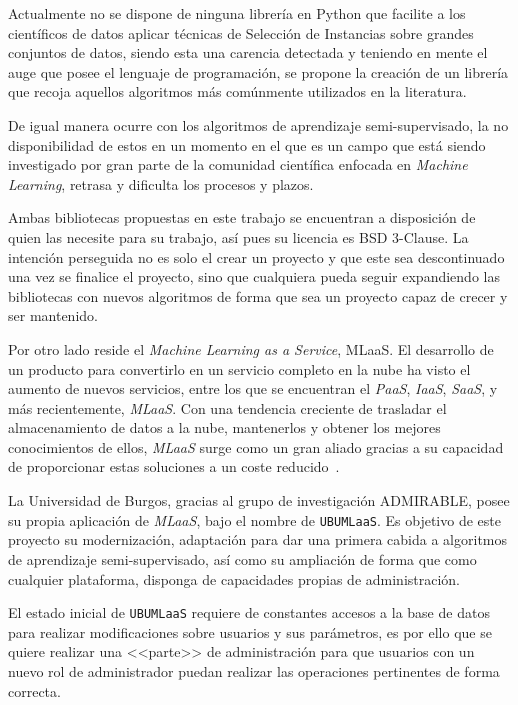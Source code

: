 
Actualmente no se dispone de ninguna librería en Python que facilite a los científicos de datos aplicar técnicas de Selección de Instancias sobre grandes conjuntos de datos, siendo esta una carencia detectada y teniendo en mente el auge que posee el lenguaje de programación, se propone la creación de un librería que recoja aquellos algoritmos más comúnmente utilizados en la literatura. 

De igual manera ocurre con los algoritmos de aprendizaje semi-supervisado, la no disponibilidad de estos en un momento en el que es un campo que está siendo investigado por gran parte de la comunidad científica enfocada en \textit{Machine Learning}, retrasa y dificulta los procesos y plazos.

Ambas bibliotecas propuestas en este trabajo se encuentran a disposición de quien las necesite para su trabajo, así pues su licencia es BSD 3-Clause. La intención perseguida no es solo el crear un proyecto y que este sea descontinuado una vez se finalice el proyecto, sino que cualquiera pueda seguir expandiendo las bibliotecas con nuevos algoritmos de forma que sea un proyecto capaz de crecer y ser mantenido.

Por otro lado reside el \textit{Machine Learning as a Service}, MLaaS. El desarrollo de un producto para convertirlo en un servicio completo en la nube ha visto el aumento de nuevos servicios, entre los que se encuentran el \textit{PaaS}, \textit{IaaS}, \textit{SaaS}, y más recientemente, \textit{MLaaS}. Con una tendencia creciente de trasladar el almacenamiento de datos a la nube, mantenerlos y obtener los mejores conocimientos de ellos, \textit{MLaaS} surge como un gran aliado gracias a su capacidad de proporcionar estas soluciones a un coste reducido~\cite{whatismlaas}.

La Universidad de Burgos, gracias al grupo de investigación ADMIRABLE, posee su propia aplicación de \textit{MLaaS}, bajo el nombre de \texttt{UBUMLaaS}. Es objetivo de este proyecto su modernización, adaptación para dar una primera cabida a algoritmos de aprendizaje semi-supervisado, así como su ampliación de forma que como cualquier plataforma, disponga de capacidades propias de administración.

El estado inicial de \texttt{UBUMLaaS} requiere de constantes accesos a la base de datos para realizar modificaciones sobre usuarios y sus parámetros, es por ello que se quiere realizar una <<parte>> de administración para que usuarios con un nuevo rol de administrador puedan realizar las operaciones pertinentes de forma correcta.


